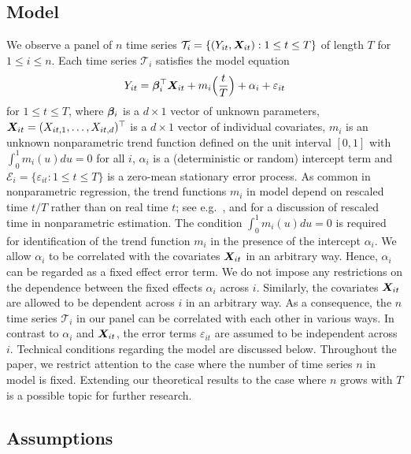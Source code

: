 \documentclass[12pt]{article}
\makeatletter
\renewcommand{\eqref}[1]{\tagform@{\ref{#1}}}
\makeatother
\begin{document}
\subsection{Model}\label{subsec:model_setting}


We observe a panel of $n$ time series $\mathcal{T}_i = \{(Y_{it}, \boldsymbol{X}_{it}): 1 \le t \le T \}$ of length $T$ for $1 \le i \le n$. Each time series $\mathcal{T}_i$ satisfies the model equation 
\begin{equation}\label{eq:model_full}
Y_{it} = \bm{\beta}^\top_i \boldsymbol{X}_{it} + m_i \Big( \frac{t}{T} \Big) + \alpha_i + \varepsilon_{it} 
\end{equation}
for $1 \le t \le T$, where $\bm{\beta}_i$ is a $d \times 1$ vector of unknown parameters, $\boldsymbol{X}_{it} = (X_{it,1},\ldots,X_{it,d})^\top$ is a $d\times 1$ vector of individual covariates, $m_i$ is an unknown nonparametric trend function defined on the unit interval $[0,1]$ with $\int_0^1 m_i(u) du = 0$ for all $i$, $\alpha_i$ is a (deterministic or random) intercept term and $\mathcal{E}_i = \{ \varepsilon_{it}: 1 \le t \le T \}$ is a zero-mean stationary error process. As common in nonparametric regression, the trend functions $m_i$ in model \eqref{eq:model_full} depend on rescaled time $t/T$ rather than on real time $t$; see e.g.\ \cite{Robinson1989}, \cite{Dahlhaus1997} and \cite{VogtLinton2014} for a discussion of rescaled time in nonparametric estimation. The condition $\int_0^1 m_i(u) du = 0$ is required for identification of the trend function $m_i$ in the presence of the intercept $\alpha_i$. We allow $\alpha_i$ to be correlated with the covariates $\boldsymbol{X}_{it}$ in an arbitrary way. Hence, $\alpha_i$ can be regarded as a fixed effect error term. We do not impose any restrictions on the dependence between the fixed effects $\alpha_i$ across $i$. Similarly, the covariates $\boldsymbol{X}_{it}$ are allowed to be dependent across $i$ in an arbitrary way. As a consequence, the $n$ time series $\mathcal{T}_i$ in our panel can be correlated with each other in various ways. In contrast to $\alpha_i$ and $\boldsymbol{X}_{it}$, the error terms $\varepsilon_{it}$ are assumed to be independent across $i$. Technical conditions regarding the model are discussed below. Throughout the paper, we restrict attention to the case where the number of time series $n$ in model \eqref{eq:model_full} is fixed. Extending our theoretical results to the case where $n$ grows with $T$ is a possible topic for further research.


\subsection{Assumptions}\label{subsec:model_assumptions}
\end{document}
